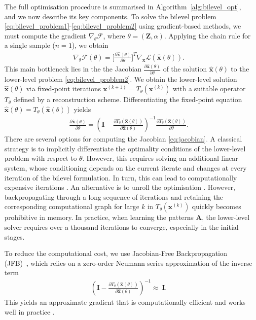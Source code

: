 \documentclass[lettersize,journal]{IEEEtran}
\providecommand{\BA}{{\mathbf A}}
\providecommand{\BZ}{{\mathbf Z}}
\providecommand{\Bx}{{\mathbf x}}
\begin{document}
The full optimisation procedure is summarised in Algorithm~\ref{alg:bilevel_opt}, and we now describe its key components.
To solve the bilevel problem \eqref{eq:bilevel_problem1}-\eqref{eq:bilevel_problem2} using gradient-based methods, we must compute the gradient $\nabla_\theta \mathcal{F}$, where $\theta = (\BZ, \alpha)$. Applying the chain rule for a single sample ($n=1$), we obtain
\begin{align}
    \nabla_\theta \mathcal{F}(\theta) = \Big[\frac{\partial \hat{\Bx}(\theta)}{\partial \theta}\Big]^T \nabla_{\Bx} \mathcal{L}(\hat{\Bx}(\theta)).
\end{align}
This main bottleneck lies in the the Jacobian $\frac{\partial \hat{\Bx}(\theta)}{\partial \theta}$ of the solution $\hat{\Bx}(\theta)$ to the lower-level problem \eqref{eq:bilevel_problem2}. We obtain the lower-level solution $\hat{\Bx}(\theta)$ via fixed-point iterations $\Bx^{(k+1)}=T_\theta(\Bx^{(k)})$ with a suitable operator $T_\theta$ defined by a reconstruction scheme.  Differentiating the fixed-point equation $\hat{\Bx}(\theta) = T_\theta(\hat{\Bx}(\theta))$ yields
\begin{align}
    \frac{\partial \hat{\Bx}(\theta)}{\partial \theta} = \left(\mathbf{I} - \frac{\partial T_\theta(\hat{\Bx}(\theta))}{\partial \hat{\Bx}(\theta)} \right)^{-1} \frac{\partial T_\theta(\hat{\Bx}(\theta))}{\partial \theta}.
    \label{eq:jacobian}
\end{align} 
There are several options for computing the Jacobian \eqref{eq:jacobian}. 
A classical strategy is to implicitly differentiate the optimality conditions of the lower-level problem with respect to $\theta$. 
However, this requires solving an additional linear system, whose conditioning depends on the current iterate and changes at every iteration of the bilevel formulation. In turn, this can lead to computationally expensive iterations \cite{Bai_2019_DeepEquilibriumModels}.
An alternative is to unroll the optimisation \cite{maclaurin2015gradient}. However, backpropagating through a long sequence of iterations and retaining the corresponding computational graph for large $k$ in $T_\theta({\Bx}^{(k)})$ quickly becomes prohibitive in memory. 
In practice, when learning the patterns $\BA$, the lower-level solver requires over a thousand iterations to converge, especially in the initial stages.

To reduce the computational cost, we use Jacobian-Free Backpropagation (JFB)~\cite{Fung_2022_JFBJacobianFreeBackpropagation}, which relies on a zero-order Neumann series approximation of the inverse term
\begin{align}
    \left( \mathbf{I} - \frac{\partial T_{\theta}(\mathbf{\hat{x}}(\theta))}{\partial \mathbf{\hat{x}}(\theta)} \right)^{-1} \approx \ \mathbf{I}.
    \label{eq:jfb}
\end{align}
This yields an approximate gradient that is computationally efficient and works well in practice \cite{Shaban_2019_TruncatedBackpropagationBilevel,Zou_2023_DeepEquilibriumLearning,Hertrich_2025_LearningRegularizationFunctionals}.
\end{document}
